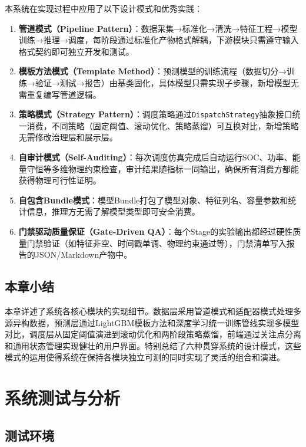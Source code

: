 \documentclass[12pt,a4paper]{ctexbook}
\begin{document}
本系统在实现过程中应用了以下设计模式和优秀实践：

\begin{enumerate}[label=(\arabic*)]
  \item \textbf{管道模式（Pipeline Pattern）}：数据采集→标准化→清洗→特征工程→模型训练→推理→调度，每阶段通过标准化产物格式解耦，下游模块只需遵守输入格式契约即可独立开发和测试。\cite{design-patterns}
  \item \textbf{模板方法模式（Template Method）}：预测模型的训练流程（数据切分→训练→验证→测试→报告）由基类固化，具体模型只需实现子步骤，新增模型无需重复编写管道逻辑。\cite{design-patterns}
  \item \textbf{策略模式（Strategy Pattern）}：调度策略通过\texttt{DispatchStrategy}抽象接口统一消费，不同策略（固定阈值、滚动优化、策略蒸馏）可互换对比，新增策略无需修改治理层和展示层。\cite{design-patterns}
  \item \textbf{自审计模式（Self-Auditing）}：每次调度仿真完成后自动运行SOC、功率、能量守恒等多维物理约束检查，审计结果随指标一同输出，确保所有消费方都能获得物理可行性证明。
  \item \textbf{自包含Bundle模式}：模型Bundle打包了模型对象、特征列名、容量参数和统计信息，推理方无需了解模型类型即可安全消费。
  \item \textbf{门禁驱动质量保证（Gate-Driven QA）}：每个Stage的实验输出都经过硬性质量门禁验证（如特征非空、时间戳单调、物理约束通过等），门禁清单写入报告的JSON/Markdown产物中。
\end{enumerate}

\section{本章小结}

本章详述了系统各核心模块的实现细节。数据层采用管道模式和适配器模式处理多源异构数据，预测层通过LightGBM模板方法和深度学习统一训练管线实现多模型对比，调度层从固定阈值演进到滚动优化和两阶段策略蒸馏，前端通过关注点分离和通用状态管理实现健壮的用户界面。特别总结了六种贯穿系统的设计模式，这些模式的运用使得系统在保持各模块独立可测的同时实现了灵活的组合和演进。

\chapter{系统测试与分析}

\section{测试环境}
\end{document}
